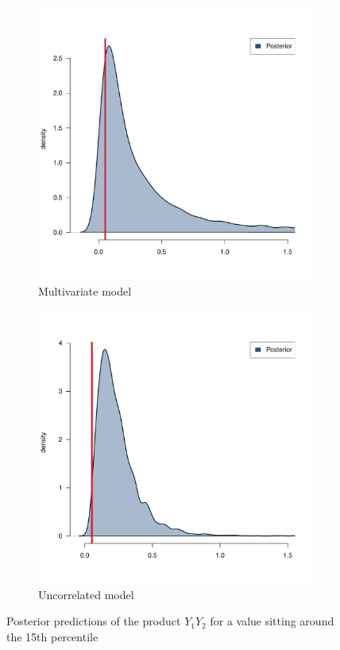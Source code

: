 \begin{figure}[htb]
	\centering
	\begin{subfigure}{0.4\textwidth}
		\includegraphics{./Figures/15th-percentile_corr.pdf}
		\caption{Multivariate model}
	\end{subfigure}
	\hfil
	\begin{subfigure}{0.4\textwidth}
		\includegraphics{./Figures/15th-percentile_uncorr.pdf}
		\caption{Uncorrelated model}
	\end{subfigure}
	\caption{Posterior predictions of the product \( Y_1 Y_2 \) for a value sitting around the 15\textup{th} percentile}
	\label{fig::res-15}
\end{figure}


